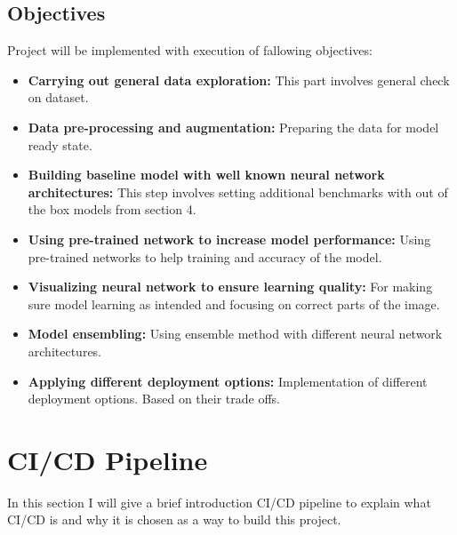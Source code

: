 \subsection{Objectives}
Project will be implemented with execution of fallowing objectives:
\begin{itemize}
    \item \textbf{Carrying out general data exploration: }This part involves general check on dataset.
    \item \textbf{Data pre-processing and augmentation: }Preparing the data for model ready state.
    \item \textbf{Building baseline model with well known neural network architectures: }This step involves setting additional benchmarks with out of the box models from section 4.
    \item \textbf{Using pre-trained network to increase model performance: }Using pre-trained networks to help training and accuracy of the model.
    \item \textbf{Visualizing neural network to ensure learning quality: } For making sure model learning as intended and focusing on correct parts of the image.
    \item \textbf{Model ensembling: }Using ensemble method with different neural network architectures.
    \item \textbf{Applying different deployment options: } Implementation of different deployment options. Based on their trade offs. 
\end{itemize}

\section{CI/CD Pipeline}
In this section I will give a brief introduction CI/CD pipeline to explain what CI/CD is and why it is chosen as a way to build this project.

